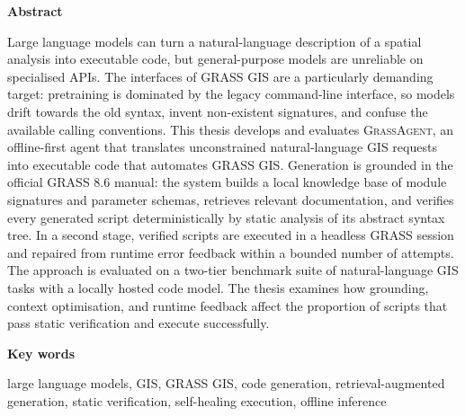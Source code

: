 \addchaptertocentry{\abstractname}
\thispagestyle{plain}
\null\vfil
\begin{center}
{\huge\bfseries{Abstract} \par}
\bigskip
\end{center}
Large language models can turn a natural-language description of a spatial analysis into executable code, but general-purpose models are unreliable on specialised APIs. The interfaces of GRASS GIS are a particularly demanding target: pretraining is dominated by the legacy command-line interface, so models drift towards the old syntax, invent non-existent signatures, and confuse the available calling conventions. This thesis develops and evaluates \textsc{GrassAgent}, an offline-first agent that translates unconstrained natural-language GIS requests into executable code that automates GRASS GIS. Generation is grounded in the official GRASS 8.6 manual: the system builds a local knowledge base of module signatures and parameter schemas, retrieves relevant documentation, and verifies every generated script deterministically by static analysis of its abstract syntax tree. In a second stage, verified scripts are executed in a headless GRASS session and repaired from runtime error feedback within a bounded number of attempts. The approach is evaluated on a two-tier benchmark suite of natural-language GIS tasks with a locally hosted code model. The thesis examines how grounding, context optimisation, and runtime feedback affect the proportion of scripts that pass static verification and execute successfully.

\begin{center}
{\large\bfseries{Key words} \par}
\bigskip
\end{center}
\noindent large language models, GIS, GRASS GIS, code generation, retrieval-augmented generation, static verification, self-healing execution, offline inference

\vfil\vfil\vfil\null

\clearpage
\thispagestyle{plain}
\null\vfil

